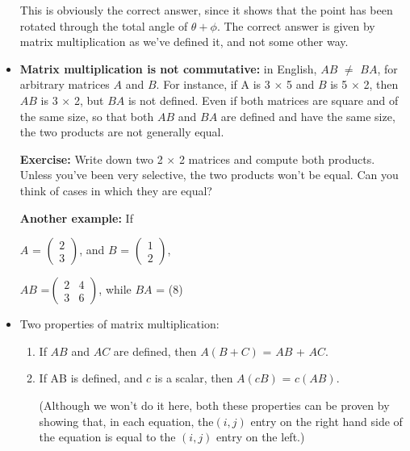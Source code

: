 \documentclass{book}
\begin{document}
\begin{itemize}
This is obviously the correct answer, since it shows that the point has been
rotated through the total angle of $\theta + \phi$. The correct answer is given by
matrix multiplication as we’ve defined it, and not some other way.

\item \textbf{Matrix multiplication is not commutative:} in English, $AB$ $\neq$ $BA$, for arbitrary matrices $A$ and $B$. For instance, if A is 3 $\times$ 5 and $B$ is 5 $\times$ 2, then $AB$ is 3 $\times$ 2, but $BA$ is not defined. Even if both matrices are square and of the same size, so that both $AB$ and $BA$ are defined and have the same size, the two products are not generally equal.

	\textbf{Exercise:} Write down two 2 $\times$ 2 matrices and compute both products. Unless you’ve been very selective, the two products won’t be equal. Can you think of cases in which they are equal?

\textbf{Another example:} If 

						\begin{center} $A$ = $\begin{pmatrix} 2 \\ 3 \end{pmatrix}$, and $B$ = $\begin{pmatrix} 1 \\ 2 \end{pmatrix}$, \end{center} 

\begin{center} $AB$ =$ \begin{pmatrix} 2 & 4 \\ 3 & 6 \end{pmatrix}$, while $BA$ = (8) \end{center}

\item Two properties of matrix multiplication: 
	\begin{enumerate} 
		\item If $AB$ and $AC$ are defined, then $A(B + C)$ = $AB$ + $AC$.
		\item If AB is defined, and $c$ is a scalar, then $A(cB)$ = $c(AB)$.

(Although we won’t do it here, both these properties can be proven by showing that, in each equation, the$ (i, j)$ entry on the right hand side of the equation is equal to the $(i, j)$ entry on the left.)
	\end{enumerate}


\end{itemize}
\end{document}
